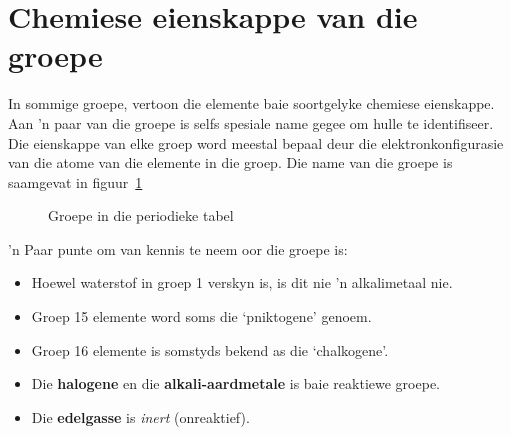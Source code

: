 \section{Chemiese eienskappe van die groepe}
 \label{m38760*secfhsst!!!underscore!!!id1062}
            \nopagebreak
            \label{m38760*id261554} In sommige groepe, vertoon die elemente baie soortgelyke chemiese eienskappe. Aan 'n paar van die groepe is selfs spesiale name gegee om hulle te identifiseer. Die eienskappe van elke groep word meestal bepaal deur die elektronkonfigurasie van die atome van die elemente in die groep. Die name van die groepe is saamgevat in figuur~\ref{fig:atom:periodic}\par
\begin{figure}[H]

\begin{center}
\end{center}

\caption{Groepe in die periodieke tabel}
\label{fig:atom:periodic}
\end{figure}  
 'n Paar punte om van kennis te neem oor die groepe is:
        \label{m38757*id261581}\begin{itemize}[noitemsep]
            \label{m38757*uid135}\item Hoewel waterstof in groep 1 verskyn is, is dit nie 'n alkalimetaal nie.
\item Groep 15 elemente word soms die ‘pniktogene’ genoem.
\label{m38757*id6232}\item Groep 16 elemente is somstyds bekend as die ‘chalkogene’.
\label{m38757*uid142}\item Die \textbf{halogene} en die \textbf{alkali-aardmetale} is baie reaktiewe groepe.
\label{m38757*uid143}\item Die \textbf{edelgasse} is \textsl{inert} (onreaktief).   
\end{itemize}            

